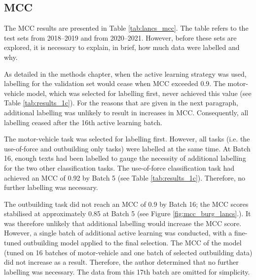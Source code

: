 \subsection{MCC} The MCC results are presented in Table \ref{tab:lancs_mcc}. The table refers to the test sets from 2018–2019 and from 2020–2021. However, before these sets are explored, it is necessary to explain, in brief, how much data were labelled and why.
 
 As detailed in the methods chapter, when the active learning strategy was used, labelling for the validation set would cease when MCC exceeded 0.9. The motor-vehicle model, which was selected for labelling first,  never achieved this value (see Table  \ref{tab:results_1c}). For the reasons that are given in the next paragraph, additional labelling was unlikely to result in increases in MCC. Consequently, all labelling ceased after the 16th active learning batch. 

The motor-vehicle task was selected for labelling first. However, all tasks (i.e. the use-of-force and outbuilding only tasks) were labelled at the same time. At Batch 16, enough texts had been labelled to gauge the necessity of additional labelling for the two other classification tasks. The use-of-force classification task had achieved an MCC of 0.92 by Batch 5 (see Table \ref{tab:results_1c}). Therefore, no further labelling was necessary.

The outbuilding task did not reach an MCC of 0.9 by Batch 16; the MCC scores stabilised at approximately 0.85 at Batch 5 (see Figure  \ref{fig:mcc_burg_lancs}.). It was therefore unlikely that additional labelling would increase the MCC score. However, a single batch of additional active learning was conducted, with a fine-tuned outbuilding model applied to the final selection. The MCC of the model (tuned on 16 batches of motor-vehicle and one batch of selected outbuilding data) did not increase as a result. Therefore, the author determined that no further labelling was necessary. The data from this 17th batch are omitted for simplicity.

